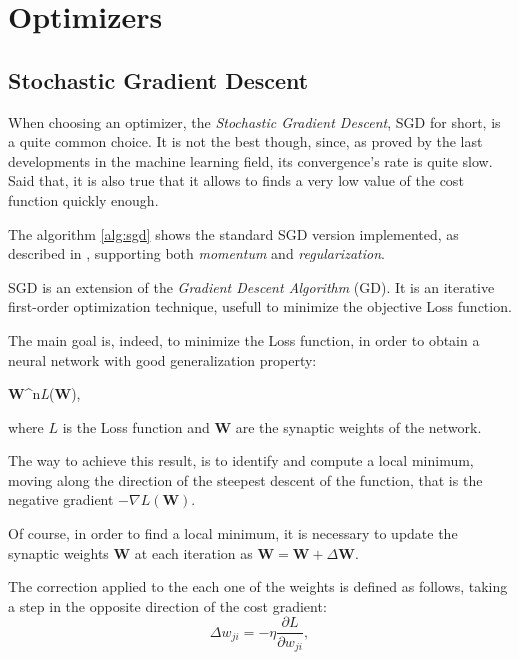 \chapter{Optimizers} %
\label{cha:optimizers}
	\section{Stochastic Gradient Descent} %
	\label{sec:sgd}
		When choosing an optimizer, the \textit{Stochastic Gradient Descent}, SGD for short, is a quite common
		choice. It is not the best though, since, as proved by the last developments in the machine learning
		field, its convergence's rate is quite slow.
		Said that, it is also true that it allows to finds a very low value of the cost function quickly enough.

		The algorithm \ref{alg:sgd} shows the standard SGD version implemented, as described in
		\cite{Goodfellow-et-al-2016}, supporting both \textit{momentum} and \textit{regularization}.
		\cite{LIVIERIS2013491}

		SGD is an extension of the \textit{Gradient Descent Algorithm} (GD). It is an iterative first-order optimization technique, usefull to minimize the objective Loss function.

		The main goal is, indeed, to minimize the Loss function, in order to obtain a neural network with good generalization property:

		\begin{mini}
		  {\textbf{W}\in {}^n}{\textit{L}(\textbf{W}),}{\label{minimization}}{}
		\end{mini}

		where $\textit{L}$ is the Loss function and \textbf{W} are the synaptic weights of the network.

		The way to achieve this result, is to identify and compute a local minimum, moving along the direction of the steepest descent of the function, that is the negative gradient $-\nabla\textit{L}(\textbf{W})$.

		Of course, in order to find a local minimum, it is necessary to update the synaptic weights \textbf{W} at each iteration as $\textbf{W} = \textbf{W} +\Delta \textbf{W}$.

		The correction applied to the each one of the weights is defined as follows, taking a step in the opposite direction of the cost gradient:
		\begin{equation}
			\label{delta_rule}
			\Delta w_{ji} = -\eta \frac{\partial\textit{L}}{\partial w_{ji}},
		\end{equation}

